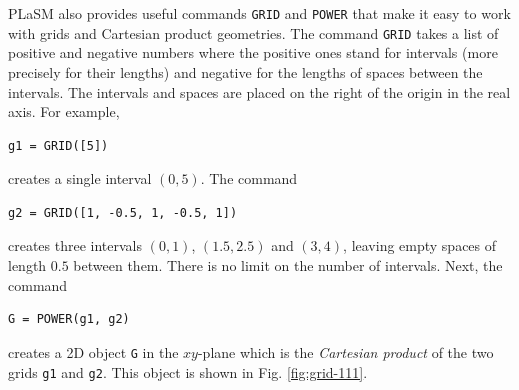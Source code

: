PLaSM also provides useful commands {\tt GRID} and {\tt POWER} that 
make it easy to work with grids and Cartesian product geometries. The command
{\tt GRID} takes a list of positive and negative numbers where the 
positive ones stand for intervals (more precisely for their lengths) 
and negative for the lengths of spaces between the intervals. The 
intervals and spaces are placed on the right of the origin in the 
real axis. For example, \\

\begin{bbox}
\begin{verbatim}
g1 = GRID([5])
\end{verbatim}
\end{bbox}
\vspace{6mm}

\noindent
creates a single interval $(0, 5)$. The command\\

\begin{bbox}
\begin{verbatim}
g2 = GRID([1, -0.5, 1, -0.5, 1])
\end{verbatim}
\end{bbox}
\vspace{6mm}

\noindent
creates three intervals $(0, 1)$, $(1.5, 2.5)$ and $(3, 4)$, 
leaving empty spaces of length $0.5$ between them. There is 
no limit on the number of intervals. Next, the command\\

\begin{bbox}
\begin{verbatim}
G = POWER(g1, g2)
\end{verbatim}
\end{bbox}
\vspace{6mm}

\noindent{}
creates a 2D object {\tt G} in the $xy$-plane which is the {\em Cartesian 
product} of the two grids {\tt g1} and {\tt g2}. This object is shown in 
Fig. \ref{fig:grid-111}.

